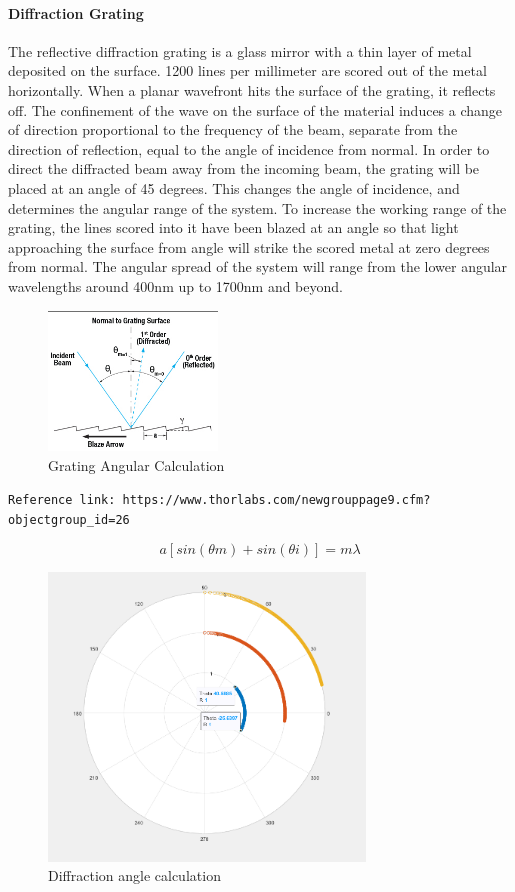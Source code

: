 \paragraph{Diffraction Grating} The reflective diffraction grating is a glass mirror with a thin layer of metal deposited on the surface. 1200 lines per millimeter are scored out of the metal horizontally. When a planar wavefront hits the surface of the grating, it reflects off. The confinement of the wave on the surface of the material induces a change of direction proportional to the frequency of the beam, separate from the direction of reflection, equal to the angle of incidence from normal. In order to direct the diffracted beam away from the incoming beam, the grating will be placed at an angle of 45 degrees. This changes the angle of incidence, and determines the angular range of the system. To increase the working range of the grating, the lines scored into it have been blazed at an angle so that light approaching the surface from angle will strike the scored metal at zero degrees from normal. The angular spread of the system will range from the lower angular wavelengths around 400nm up to 1700nm and beyond. 
\begin{figure}[H]
    \caption{Grating Angular Calculation}
    \centering
    \includegraphics[width=0.4\textwidth]{images/ThorlabsGratingTutorial.png}
\end{figure}
\verb"Reference link: https://www.thorlabs.com/newgrouppage9.cfm?objectgroup_id=26"

\begin{equation}
    a[sin(\theta m)+sin(\theta i)] = m\lambda
\end{equation}

\begin{figure}[H]
    \caption{Diffraction angle calculation}
    \centering
    \includegraphics[width=0.75\textwidth]{images/DiffractionAngleCalculator.png}
\end{figure}

